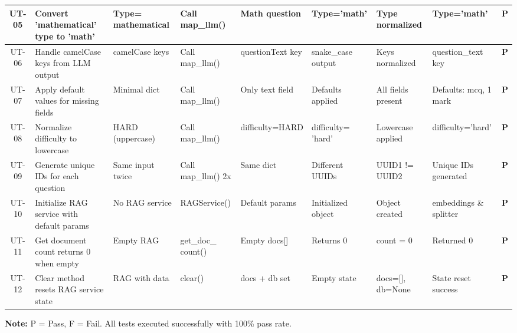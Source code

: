 \documentclass{article}
\begin{document}
\begin{longtable}{|c|p{3.5cm}|p{1.8cm}|p{1.8cm}|p{2cm}|p{1.8cm}|p{1.8cm}|p{2cm}|c|}
UT-05 & Convert 'mathematical' type to 'math' & Type= mathematical & Call map\_llm() & Math question & Type='math' & Type normalized & Type='math' & \cellcolor{green!40} \textbf{P} \\
\hline

UT-06 & Handle camelCase keys from LLM output & camelCase keys & Call map\_llm() & questionText key & snake\_case output & Keys normalized & question\_text key & \cellcolor{green!40} \textbf{P} \\
\hline

UT-07 & Apply default values for missing fields & Minimal dict & Call map\_llm() & Only text field & Defaults applied & All fields present & Defaults: mcq, 1 mark & \cellcolor{green!40} \textbf{P} \\
\hline

UT-08 & Normalize difficulty to lowercase & HARD (uppercase) & Call map\_llm() & difficulty=HARD & difficulty= 'hard' & Lowercase applied & difficulty='hard' & \cellcolor{green!40} \textbf{P} \\
\hline

UT-09 & Generate unique IDs for each question & Same input twice & Call map\_llm() 2x & Same dict & Different UUIDs & UUID1 != UUID2 & Unique IDs generated & \cellcolor{green!40} \textbf{P} \\
\hline

UT-10 & Initialize RAG service with default params & No RAG service & RAGService() & Default params & Initialized object & Object created & embeddings \& splitter & \cellcolor{green!40} \textbf{P} \\
\hline

UT-11 & Get document count returns 0 when empty & Empty RAG & get\_doc\_ count() & Empty docs[] & Returns 0 & count = 0 & Returned 0 & \cellcolor{green!40} \textbf{P} \\
\hline

UT-12 & Clear method resets RAG service state & RAG with data & clear() & docs + db set & Empty state & docs=[], db=None & State reset success & \cellcolor{green!40} \textbf{P} \\
\hline

\end{longtable}

\vspace{0.3cm}

\noindent\textbf{Note:} P = Pass, F = Fail. All tests executed successfully with 100\% pass rate.
\end{document}
